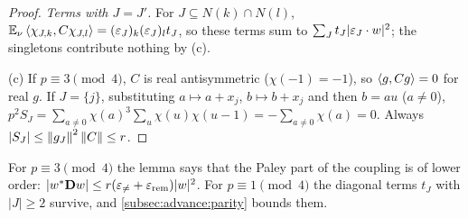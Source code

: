 \begin{proof}
\emph{Terms with $J=J'$.} For $J\subseteq N(k)\cap N(l)$,
$\mathbb E_\nu\left\langle \chi_{J,k},C\chi_{J,l}\right\rangle=(\varepsilon_J)_k(\varepsilon_J)_lt_J$, so these terms sum to
$\sum_Jt_J|\varepsilon_J\cdot w|^2$; the singletons contribute nothing by (c).

(c) If $p\equiv3\pmod4$, $C$ is real antisymmetric ($\chi(-1)=-1$), so
$\left\langle g,Cg\right\rangle=0$ for real $g$. If $J=\{j\}$, substituting $a\mapsto a+x_j$,
$b\mapsto b+x_j$ and then $b=au$ ($a\ne0$),
$p^2S_J=\sum_{a\ne0}\chi(a)^3\sum_u\chi(u)\chi(u-1)=-\sum_{a\ne0}\chi(a)=0$. Always
$|S_J|\le\left\|g_J\right\|^2\left\|C\right\|\le r$.
\end{proof}

For $p\equiv3\pmod4$ the lemma says that the Paley part of the coupling is of
lower order: $|w^*\mathbf Dw|\le r(\varepsilon_{\ne}+\varepsilon_{\rm rem})|w|^2$. For $p\equiv1\pmod4$ the
diagonal terms $t_J$ with $|J|\ge2$ survive, and \cref{subsec:advance:parity} bounds
them.

